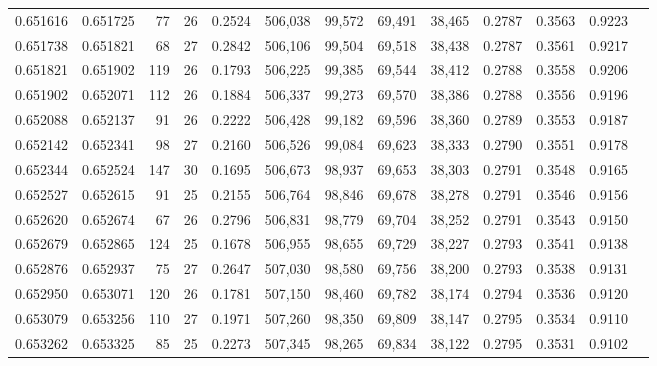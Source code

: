 \begin{tabular}{rrrrrrrrrrrrr}
0.651616 & 0.651725 &    77 &  26 &                                     0.2524 & 506,038 &  99,572 &  69,491 &  38,465 & 0.2787 & 0.3563 & 0.9223 \\
0.651738 & 0.651821 &    68 &  27 &                                     0.2842 & 506,106 &  99,504 &  69,518 &  38,438 & 0.2787 & 0.3561 & 0.9217 \\
0.651821 & 0.651902 &   119 &  26 &                                     0.1793 & 506,225 &  99,385 &  69,544 &  38,412 & 0.2788 & 0.3558 & 0.9206 \\
0.651902 & 0.652071 &   112 &  26 &                                     0.1884 & 506,337 &  99,273 &  69,570 &  38,386 & 0.2788 & 0.3556 & 0.9196 \\
0.652088 & 0.652137 &    91 &  26 &                                     0.2222 & 506,428 &  99,182 &  69,596 &  38,360 & 0.2789 & 0.3553 & 0.9187 \\
0.652142 & 0.652341 &    98 &  27 &                                     0.2160 & 506,526 &  99,084 &  69,623 &  38,333 & 0.2790 & 0.3551 & 0.9178 \\
0.652344 & 0.652524 &   147 &  30 &                                     0.1695 & 506,673 &  98,937 &  69,653 &  38,303 & 0.2791 & 0.3548 & 0.9165 \\
0.652527 & 0.652615 &    91 &  25 &                                     0.2155 & 506,764 &  98,846 &  69,678 &  38,278 & 0.2791 & 0.3546 & 0.9156 \\
0.652620 & 0.652674 &    67 &  26 &                                     0.2796 & 506,831 &  98,779 &  69,704 &  38,252 & 0.2791 & 0.3543 & 0.9150 \\
0.652679 & 0.652865 &   124 &  25 &                                     0.1678 & 506,955 &  98,655 &  69,729 &  38,227 & 0.2793 & 0.3541 & 0.9138 \\
0.652876 & 0.652937 &    75 &  27 &                                     0.2647 & 507,030 &  98,580 &  69,756 &  38,200 & 0.2793 & 0.3538 & 0.9131 \\
0.652950 & 0.653071 &   120 &  26 &                                     0.1781 & 507,150 &  98,460 &  69,782 &  38,174 & 0.2794 & 0.3536 & 0.9120 \\
0.653079 & 0.653256 &   110 &  27 &                                     0.1971 & 507,260 &  98,350 &  69,809 &  38,147 & 0.2795 & 0.3534 & 0.9110 \\
0.653262 & 0.653325 &    85 &  25 &                                     0.2273 & 507,345 &  98,265 &  69,834 &  38,122 & 0.2795 & 0.3531 & 0.9102 \\

\end{tabular}
